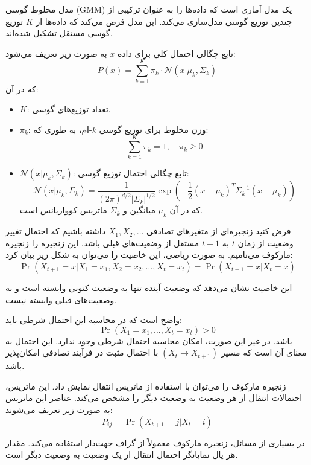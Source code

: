 \documentclass[a4paper,12pt,openany]{report}
\begin{document}
\begin{description}
		مدل مخلوط گوسی (GMM) یک مدل آماری است که داده‌ها را به عنوان ترکیبی از چندین توزیع گوسی مدل‌سازی می‌کند. این مدل فرض می‌کند که داده‌ها از \( K \) توزیع گوسی مستقل تشکیل شده‌اند. 
		
		تابع چگالی احتمال کلی برای داده \( x \) به صورت زیر تعریف می‌شود:
		\[
		P(x) = \sum_{k=1}^{K} \pi_k \cdot \mathcal{N}(x | \mu_k, \Sigma_k)
		\]
		که در آن:
		\begin{itemize}
			\item \( K \): تعداد توزیع‌های گوسی.
			\item \( \pi_k \): وزن مخلوط برای توزیع گوسی \( k \)-ام، به طوری که:
			\[
			\sum_{k=1}^{K} \pi_k = 1, \quad \pi_k \geq 0
			\]
			\item \( \mathcal{N}(x | \mu_k, \Sigma_k) \): تابع چگالی احتمال توزیع گوسی:
			\[
			\mathcal{N}(x | \mu_k, \Sigma_k) = \frac{1}{(2\pi)^{d/2} |\Sigma_k|^{1/2}} \exp\left(-\frac{1}{2}(x - \mu_k)^T \Sigma_k^{-1} (x - \mu_k)\right)
			\]
			که در آن \( \mu_k \) میانگین و \( \Sigma_k \) ماتریس کوواریانس است.
		\end{itemize}
		
	\item[\textbullet\ زنجیره و مدل پنهان مارکوف:]
		
		فرض کنید زنجیره‌ای از متغیرهای تصادفی \( X_1, X_2, \ldots \) داشته باشیم که احتمال تغییر وضعیت از زمان \( t \) به \( t+1 \) مستقل از وضعیت‌های قبلی باشد. این زنجیره را زنجیره مارکوف می‌نامیم. به صورت ریاضی، این خاصیت را می‌توان به شکل زیر بیان کرد:
		\[
		\Pr(X_{t+1} = x | X_1 = x_1, X_2 = x_2, \ldots, X_t = x_t) = \Pr(X_{t+1} = x | X_t = x)
		\]
		
		این خاصیت نشان می‌دهد که وضعیت آینده تنها به وضعیت کنونی وابسته است و به وضعیت‌های قبلی وابسته نیست.
		
		
	
		واضح است که در محاسبه این احتمال شرطی باید:
		\[
		\Pr(X_1 = x_1, \ldots, X_t = x_t) > 0
		\]
		باشد. در غیر این صورت، امکان محاسبه احتمال شرطی وجود ندارد. این احتمال به معنای آن است که مسیر \( (X_t \to X_{t+1}) \) با احتمال مثبت در فرآیند تصادفی امکان‌پذیر باشد.
		
		
		زنجیره مارکوف را می‌توان با استفاده از ماتریس انتقال نمایش داد. این ماتریس، احتمالات انتقال از هر وضعیت به وضعیت دیگر را مشخص می‌کند. عناصر این ماتریس به صورت زیر تعریف می‌شوند:
		\[
		P_{ij} = \Pr(X_{t+1} = j | X_t = i)
		\]
		
		در بسیاری از مسائل، زنجیره مارکوف معمولاً از گراف جهت‌دار استفاده می‌کند. مقدار هر یال نمایانگر احتمال انتقال از یک وضعیت به وضعیت دیگر است.
		


\end{description}
\end{document}
